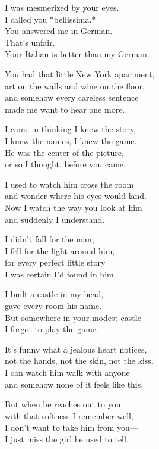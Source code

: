 \begin{lyrics}

I was mesmerized by your eyes.\\
I called you *bellissima.*\\
You answered me in German.\\
That's unfair.\\
Your Italian is better than my German.


You had that little New York apartment,\\
art on the walls and wine on the floor,\\
and somehow every careless sentence\\
made me want to hear one more.

I came in thinking I knew the story,\\
I knew the names, I knew the game.\\
He was the center of the picture,\\
or so I thought, before you came.


I used to watch him cross the room\\
and wonder where his eyes would land.\\
Now I watch the way you look at him\\
and suddenly I understand.


I didn't fall for the man,\\
I fell for the light around him,\\
for every perfect little story\\
I was certain I'd found in him.

I built a castle in my head,\\
gave every room his name.\\
But somewhere in your modest castle\\
I forgot to play the game.


It's funny what a jealous heart notices,\\
not the hands, not the skin, not the kiss.\\
I can watch him walk with anyone\\
and somehow none of it feels like this.

But when he reaches out to you\\
with that softness I remember well,\\
I don't want to take him from you—\\
I just miss the girl he used to tell.


\end{lyrics}
